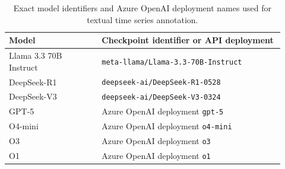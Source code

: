 \begin{table}[htbp]
\caption{
Exact model identifiers and Azure OpenAI deployment names used for textual
time series annotation.
}
\ChFiveTableBodyStart
\begin{ChFiveFloatBody}

\centering


\scriptsize
\setlength{\tabcolsep}{6pt}
\renewcommand{\arraystretch}{1.15}
\begin{tabular}{>{\raggedright\arraybackslash}p{0.31\linewidth} >{\raggedright\arraybackslash}p{0.61\linewidth}}
\toprule
\textbf{Model} &
\textbf{Checkpoint identifier or API deployment} \\
\midrule

Llama 3.3 70B Instruct &
\texttt{meta-llama/Llama-3.3-70B-Instruct} \\

DeepSeek-R1 &
\texttt{deepseek-ai/DeepSeek-R1-0528} \\

DeepSeek-V3 &
\texttt{deepseek-ai/DeepSeek-V3-0324} \\

GPT-5 &
Azure OpenAI deployment \texttt{gpt-5} \\

O4-mini &
Azure OpenAI deployment \texttt{o4-mini} \\

O3 &
Azure OpenAI deployment \texttt{o3} \\

O1 &
Azure OpenAI deployment \texttt{o1} \\

\bottomrule
\end{tabular}

\end{ChFiveFloatBody}
\end{table}